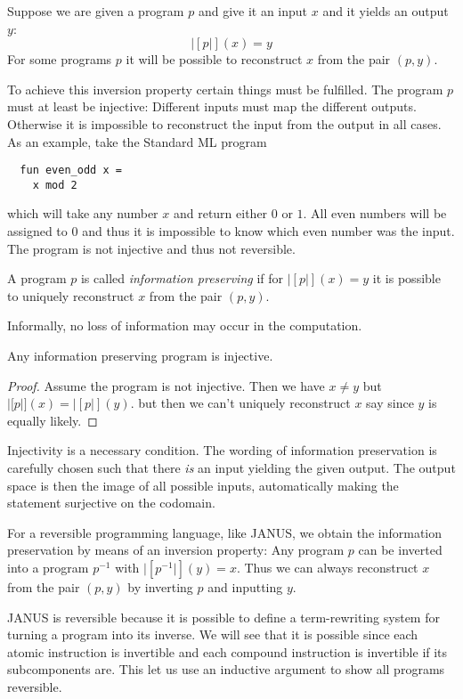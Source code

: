 Suppose we are given a program $p$ and give it an input $x$ and it
yields an output $y$:
\begin{equation*}
  |[p|](x) = y
\end{equation*}
For some programs $p$ it will be possible to reconstruct $x$ from the
pair $(p, y)$.

To achieve this inversion property certain things must be
fulfilled. The program $p$ must at least be injective: Different
inputs must map the different outputs. Otherwise it is impossible to
reconstruct the input from the output in all cases. As an example,
take the Standard ML program
\begin{verbatim}
  fun even_odd x =
    x mod 2
\end{verbatim}
which will take any number $x$ and return either $0$ or $1$. All even
numbers will be assigned to $0$ and thus it is impossible to know
which even number was the input. The program is not injective and thus
not reversible.

\begin{defn}
  A program $p$ is called \emph{information preserving} if for
  $|[p|](x) = y$ it is possible to uniquely reconstruct $x$ from the
  pair $(p, y)$.
\end{defn}
Informally, no loss of information may occur in the computation.

\begin{thm}
  Any information preserving program is injective.
\end{thm}
\begin{proof}
  Assume the program is not injective. Then we have $x \neq y$ but
  $|[p|](x) = |[p|](y)$. but then we can't uniquely reconstruct $x$
  say since $y$ is equally likely.
\end{proof}
Injectivity is a necessary condition. The wording of information
preservation is carefully chosen such that there \emph{is} an input
yielding the given output. The output space is then the image of all
possible inputs, automatically making the statement surjective on the
codomain.

For a reversible programming language, like JANUS, we obtain the
information preservation by means of an inversion property: Any
program $p$ can be inverted into a program $p^{-1}$ with
$|[p^{-1}|](y) = x$. Thus we can always reconstruct $x$ from the pair
$(p, y)$ by inverting $p$ and inputting $y$.

JANUS is reversible because it is possible to define a term-rewriting
system for turning a program into its inverse. We will see that it is
possible since each atomic instruction is invertible and each compound
instruction is invertible if its subcomponents are. This let us use an
inductive argument to show all programs reversible.

